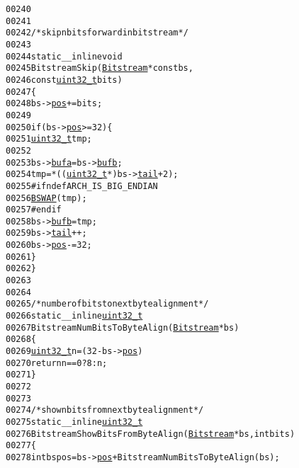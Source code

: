 \begin{footnotesize}
\begin{alltt}
00240 
00241 
00242 \textcolor{comment}{/* skip n bits forward in bitstream */}
00243 
00244 \textcolor{keyword}{static} \_\_inline \textcolor{keywordtype}{void}
00245 BitstreamSkip(\hyperlink{struct_bitstream}{Bitstream} * \textcolor{keyword}{const} bs,
00246                           \textcolor{keyword}{const} \hyperlink{_types_8h_a04909d1366bb244ff2482beb51635f37}{uint32_t} bits)
00247 \{
00248         bs->\hyperlink{struct_bitstream_ac7479c4c4e57d10bbfdd90baf6e731a4}{pos} += bits;
00249 
00250         \textcolor{keywordflow}{if} (bs->\hyperlink{struct_bitstream_ac7479c4c4e57d10bbfdd90baf6e731a4}{pos} >= 32) \{
00251                 \hyperlink{_types_8h_a04909d1366bb244ff2482beb51635f37}{uint32_t} tmp;
00252 
00253                 bs->\hyperlink{struct_bitstream_a2b3b7e703efb5f16a9b122862f6342ff}{bufa} = bs->\hyperlink{struct_bitstream_af88938159f6b589af03d736e9fe8119e}{bufb};
00254                 tmp = *((\hyperlink{_types_8h_a04909d1366bb244ff2482beb51635f37}{uint32_t} *) bs->\hyperlink{struct_bitstream_addd740548c260796cf01e55597f749c6}{tail} + 2);
00255 \textcolor{preprocessor}{#ifndef ARCH\_IS\_BIG\_ENDIAN}
00256 \textcolor{preprocessor}{}                \hyperlink{_macros_8h_acd886eee9738d4807d25c1baac1e839e}{BSWAP}(tmp);
00257 \textcolor{preprocessor}{#endif}
00258 \textcolor{preprocessor}{}                bs->\hyperlink{struct_bitstream_af88938159f6b589af03d736e9fe8119e}{bufb} = tmp;
00259                 bs->\hyperlink{struct_bitstream_addd740548c260796cf01e55597f749c6}{tail}++;
00260                 bs->\hyperlink{struct_bitstream_ac7479c4c4e57d10bbfdd90baf6e731a4}{pos} -= 32;
00261         \}
00262 \}
00263 
00264 
00265 \textcolor{comment}{/* number of bits to next byte alignment */}
00266 \textcolor{keyword}{static} \_\_inline \hyperlink{_types_8h_a04909d1366bb244ff2482beb51635f37}{uint32_t}
00267 BitstreamNumBitsToByteAlign(\hyperlink{struct_bitstream}{Bitstream} *bs)
00268 \{
00269         \hyperlink{_types_8h_a04909d1366bb244ff2482beb51635f37}{uint32_t} n = (32 - bs->\hyperlink{struct_bitstream_ac7479c4c4e57d10bbfdd90baf6e731a4}{pos}) % 8;
00270         \textcolor{keywordflow}{return} n == 0 ? 8 : n;
00271 \}
00272 
00273 
00274 \textcolor{comment}{/* show nbits from next byte alignment */}
00275 \textcolor{keyword}{static} \_\_inline \hyperlink{_types_8h_a04909d1366bb244ff2482beb51635f37}{uint32_t}
00276 BitstreamShowBitsFromByteAlign(\hyperlink{struct_bitstream}{Bitstream} *bs, \textcolor{keywordtype}{int} bits)
00277 \{
00278         \textcolor{keywordtype}{int} bspos = bs->\hyperlink{struct_bitstream_ac7479c4c4e57d10bbfdd90baf6e731a4}{pos} + BitstreamNumBitsToByteAlign(bs);

\end{alltt}
\end{footnotesize}
